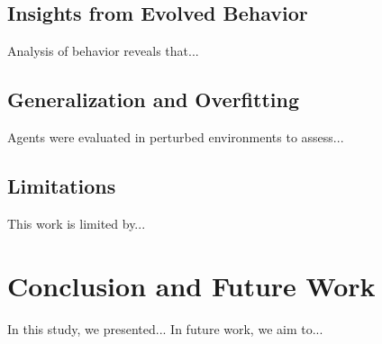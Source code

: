 \documentclass[journal,12pt,onecolumn]{IEEEtran}
\begin{document}
\subsection{Insights from Evolved Behavior}
Analysis of behavior reveals that...

\subsection{Generalization and Overfitting}
Agents were evaluated in perturbed environments to assess...

\subsection{Limitations}
This work is limited by...

\section{Conclusion and Future Work}
In this study, we presented... In future work, we aim to...



\end{document}
